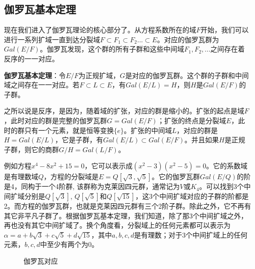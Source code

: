 \documentclass[b5paper]{ctexart}
\begin{document}
\subsection{伽罗瓦基本定理}

现在我们进入了伽罗瓦理论的核心部分了。从方程系数所在的域$F$开始，我们可以进行一系列扩域一直到达分裂域$F \subset F_1 \subset F_2 ... \subset E$。对应的伽罗瓦群为$Gal(E/F)$。伽罗瓦发现，这个群的所有子群和这些中间域$F_1, F_2, ...$之间存在着反序的一一对应。

\begin{theorem}
\textbf{伽罗瓦基本定理}：令$E/F$为正规扩域，$G$是对应的伽罗瓦群。这个群的子群和中间域之间存在一一对应。若$F \subset L \subset E$，有$Gal(E/L) = H$，则$H$是$Gal(E/F)$的子群。
\end{theorem}

之所以说是反序，是因为，随着域的扩张，对应的群是缩小的。扩张的起点是域$F$，此时对应的群是完整的伽罗瓦群$G = Gal(E/F)$；扩张的终点是分裂域$E$，此时的群只有一个元素，就是恒等变换$\{e\}$。扩张的中间域$L$，对应的群是$H = Gal(E/L)$，它是子群，有$Gal(E/L) \subset Gal(E/F)$。并且如果$H$是正规子群，则它的商群$G/H = Gal(L/F)$。

例如方程$x^4 - 8x^2 + 15 = 0$，它可以表示成$(x^2 - 3)(x^2 - 5) = 0$。它的系数域是有理数域$Q$，方程的分裂域是$E = Q[\sqrt{3}, \sqrt{5}]$。它的伽罗瓦群$Gal(E/Q)$的阶是4，同构于一个4阶群, 该群称为克莱因四元群，通常记为$V$或$K_4$。可以找到3个中间扩域分别是$Q[\sqrt{3}]$, $Q[\sqrt{5}]$和$Q[\sqrt{15}]$，这3个中间扩域对应的子群的阶都是2。而方程的伽罗瓦群，也就是克莱因四元群有三个2阶子群。除此之外，它不再有其它非平凡子群了。根据伽罗瓦基本定理，我们知道，除了那3个中间扩域之外，再也没有其它中间扩域了。换个角度看，分裂域上的任何元素都可以表示为$\alpha = a + b\sqrt{3} + c\sqrt{5} + d\sqrt{15}$，其中$a, b, c, d$是有理数；对于3个中间扩域上的任何元素，$b, c, d$中至少有两个为0。

\begin{figure}[htbp]
\centering
{}
\caption{伽罗瓦对应}
\label{fig:Galois-Correspondence}
\end{figure}
\end{document}
